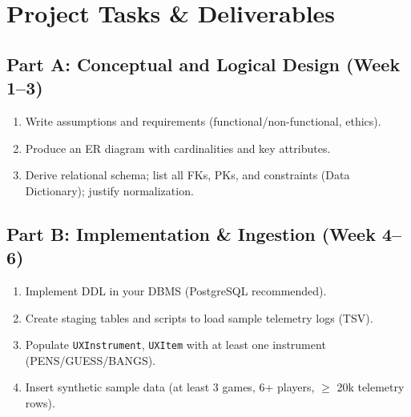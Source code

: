 \documentclass[11pt]{article}
\begin{document}
%

\section{Project Tasks \& Deliverables}

\subsection*{Part A: Conceptual and Logical Design (Week 1--3)}
\begin{enumerate}[leftmargin=*]
  \item Write assumptions and requirements (functional/non-functional, ethics).
  \item Produce an ER diagram with cardinalities and key attributes.
  \item Derive relational schema; list all FKs, PKs, and constraints (Data Dictionary); justify normalization.
\end{enumerate}

\subsection*{Part B: Implementation \& Ingestion (Week 4--6)}
\begin{enumerate}[leftmargin=*]
  \item Implement DDL in your DBMS (PostgreSQL recommended).
  \item Create staging tables and scripts to load sample telemetry logs (TSV).
  \item Populate \texttt{UXInstrument}, \texttt{UXItem} with at least one instrument (PENS/GUESS/BANGS).
  \item Insert synthetic sample data (at least 3 games, 6+ players, $\geq$ 20k telemetry rows).
\end{enumerate}
\end{document}
